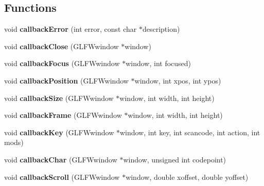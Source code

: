\subsection*{Functions}
\begin{DoxyCompactItemize}
\item 
\mbox{\label{namespaceflounder_ad7d35bbad7a6d0899ac9e3c0995d647b}} 
void {\bfseries callback\+Error} (int error, const char $\ast$description)
\item 
\mbox{\label{namespaceflounder_acc0f360793fc7aaadd19091c3f1ffafa}} 
void {\bfseries callback\+Close} (G\+L\+F\+Wwindow $\ast$window)
\item 
\mbox{\label{namespaceflounder_a1d6065cc47084937a4d2673ab12844f0}} 
void {\bfseries callback\+Focus} (G\+L\+F\+Wwindow $\ast$window, int focused)
\item 
\mbox{\label{namespaceflounder_a390037dac78dfbe22628a15e16fa3ce8}} 
void {\bfseries callback\+Position} (G\+L\+F\+Wwindow $\ast$window, int xpos, int ypos)
\item 
\mbox{\label{namespaceflounder_ac2c6a4e443858e377538ac4a4bb357b0}} 
void {\bfseries callback\+Size} (G\+L\+F\+Wwindow $\ast$window, int width, int height)
\item 
\mbox{\label{namespaceflounder_a8a1582884f2eb56eff1033920ed90bb8}} 
void {\bfseries callback\+Frame} (G\+L\+F\+Wwindow $\ast$window, int width, int height)
\item 
\mbox{\label{namespaceflounder_aedc5b150f5c57785e29b1594ceeb9daf}} 
void {\bfseries callback\+Key} (G\+L\+F\+Wwindow $\ast$window, int key, int scancode, int action, int mods)
\item 
\mbox{\label{namespaceflounder_a9fc9a8711933a0dc2ab6a8dd2145a9ff}} 
void {\bfseries callback\+Char} (G\+L\+F\+Wwindow $\ast$window, unsigned int codepoint)
\item 
\mbox{\label{namespaceflounder_a6817b4cc37291e7367063bd99f36cfaf}} 
void {\bfseries callback\+Scroll} (G\+L\+F\+Wwindow $\ast$window, double xoffset, double yoffset)

\end{DoxyCompactItemize}
